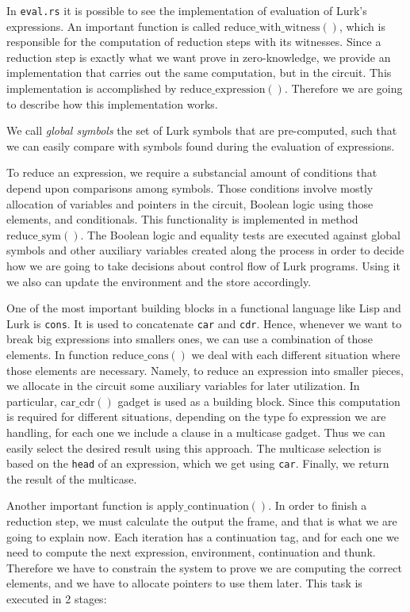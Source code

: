 \documentclass[10pt, english]{article}
\newcommand{\redexp}{\mathrm{reduce\_expression}}
\newcommand{\redwithwit}{\mathrm{reduce\_with\_witness}}
\newcommand{\redcons}{\mathrm{reduce\_cons}}
\newcommand{\redsym}{\mathrm{reduce\_sym}}
\newcommand{\applycont}{\mathrm{apply\_continuation}}
\newcommand{\carcdr}{\mathrm{car\_cdr}}
\newcommand{\makethunk}{\mathrm{make\_thunk}}
\begin{document}
In \verb|eval.rs| it is possible to see the implementation of evaluation of Lurk's expressions. An important function is called $\redwithwit()$, which is responsible for the computation of reduction steps with its witnesses. Since a reduction step is exactly what we want prove in zero-knowledge, we provide an implementation that carries out the same computation, but in the circuit. This implementation is accomplished by $\redexp()$. Therefore we are going to describe how this implementation works.

We call \textit{global symbols} the set of Lurk symbols that are pre-computed, such that we can easily compare with symbols found during the evaluation of expressions.

To reduce an expression, we require a substancial amount of conditions that depend upon comparisons among symbols. Those conditions involve mostly allocation of variables and pointers in the circuit, Boolean logic using those elements, and conditionals. This functionality is implemented in method $\redsym()$. The Boolean logic and equality tests are executed against global symbols and other auxiliary variables created along the process in order to decide how we are going to take decisions about control flow of Lurk programs. Using it we also can update the environment and the store accordingly.

One of the most important building blocks in a functional language like Lisp and Lurk is \verb|cons|. It is used to concatenate \verb|car| and \verb|cdr|. Hence, whenever we want to break big expressions into smallers ones, we can use a combination of those elements. In function $\redcons()$ we deal with each different situation where those elements are necessary. Namely, to reduce an expression into smaller pieces, we allocate in the circuit some auxiliary variables for later utilization. In particular, $\carcdr()$ gadget is used as a building block. Since this computation is required for different situations, depending on the type fo expression we are handling, for each one we include a clause in a multicase gadget. Thus we can easily select the desired result using this approach. The multicase selection is based on the \verb|head| of an expression, which we get using \verb|car|. Finally, we return the result of the multicase.



Another important function is $\applycont()$. In order to finish a reduction step, we must calculate the output the frame, and that is what we are going to explain now. Each iteration has a continuation tag, and for each one we need to compute the next expression, environment, continuation and thunk. Therefore we have to constrain the system to prove we are computing the correct elements, and we have to allocate pointers to use them later. This task is executed in 2 stages:
\end{document}
